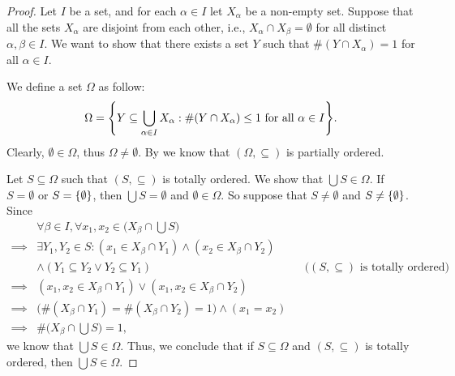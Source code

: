 \begin{proof}
  Let \(I\) be a set, and for each \(\alpha \in I\) let \(X_{\alpha}\) be a non-empty set.
  Suppose that all the sets \(X_{\alpha}\) are disjoint from each other, i.e., \(X_{\alpha} \cap X_{\beta} = \emptyset\) for all distinct \(\alpha, \beta \in I\).
  We want to show that there exists a set \(Y\) such that \(\#(Y \cap X_{\alpha}) = 1\) for all \(\alpha \in I\).

  We define a set \(\Omega\) as follow:
  \[
    \Omega = \set{Y \subseteq \bigcup_{\alpha \in I} X_{\alpha} : \#(Y \cap X_{\alpha}) \leq 1 \text{ for all } \alpha \in I}.
  \]
  Clearly, \(\emptyset \in \Omega\), thus \(\Omega \neq \emptyset\).
  By  we know that \((\Omega, \subseteq)\) is partially ordered.

  Let \(S \subseteq \Omega\) such that \((S, \subseteq)\) is totally ordered.
  We show that \(\bigcup S \in \Omega\).
  If \(S = \emptyset\) or \(S = \left\lbrace\emptyset\right\rbrace\), then \(\bigcup S = \emptyset\) and \(\emptyset \in \Omega\).
  So suppose that \(S \neq \emptyset\) and \(S \neq \left\lbrace\emptyset\right\rbrace\).
  Since
  \begin{align*}
             & \forall \beta \in I, \forall x_1, x_2 \in \Big(X_{\beta} \cap \bigcup S\Big)                                                                 \\
    \implies & \exists Y_1, Y_2 \in S : (x_1 \in X_{\beta} \cap Y_1) \land (x_2 \in X_{\beta} \cap Y_2)                                                     \\
             & \land (Y_1 \subseteq Y_2 \lor Y_2 \subseteq Y_1)                                         &  & \text{(\((S, \subseteq)\) is totally ordered)} \\
    \implies & (x_1, x_2 \in X_{\beta} \cap Y_1) \lor (x_1, x_2 \in X_{\beta} \cap Y_2)                                                                     \\
    \implies & \big(\#(X_{\beta} \cap Y_1) = \#(X_{\beta} \cap Y_2) = 1\big) \land (x_1 = x_2)                                                              \\
    \implies & \#\Big(X_{\beta} \cap \bigcup S\Big) = 1,
  \end{align*}
  we know that \(\bigcup S \in \Omega\).
  Thus, we conclude that if \(S \subseteq \Omega\) and \((S, \subseteq)\) is totally ordered, then \(\bigcup S \in \Omega\).


\end{proof}
